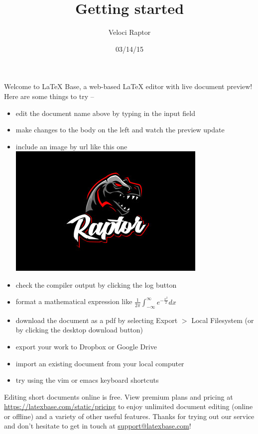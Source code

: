 \documentclass[12pt]{article}
\title{Getting started}
\author{Veloci Raptor}
\date{03/14/15}
\begin{document}
\maketitle

Welcome to LaTeX Base, a web-based \LaTeX{} editor with live document preview!
Here are some things to try --

\begin{itemize}
  \item edit the document name above by typing in the input field
  \item make changes to the body on the left and watch the preview update
  \item include an image by url like this one
        \hspace*{3em}
        \includegraphics{../media/raptor.jpg}
  \item check the compiler output by clicking the log button
  \item format a mathematical expression like
        $\frac{1}{2\pi}\int_{-\infty}^{\infty}e^{-\frac{x^2}{2}}dx$
  \item download the document as a pdf by selecting Export $>$ Local
        Filesystem (or by clicking the desktop download button)
  \item export your work to Dropbox or Google Drive
  \item import an existing document from your local computer
  \item try using the vim or emacs keyboard shortcuts
\end{itemize}

Editing short documents online is free. View premium plans and pricing at
\url{https://latexbase.com/static/pricing} to enjoy unlimited document editing
(online or offline) and a variety of other useful features. Thanks for trying
out our service and don't hesitate to get in touch at
\href{mailto:support@latexbase.com}{support@latexbase.com}!
\end{document}
